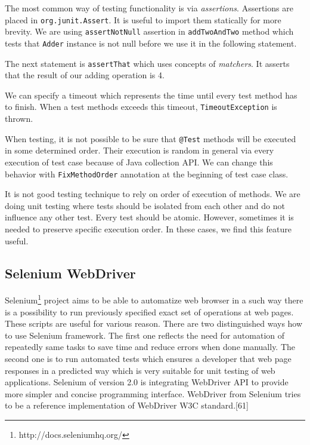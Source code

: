 \documentclass[12pt,final,oneside]{fithesis}
\begin{document}
The most common way of testing functionality is via \textit{assertions}. Assertions are placed in \texttt{org.junit.Assert}. It is useful to import them statically for more brevity. We are using \texttt{assertNotNull} assertion in \texttt{addTwoAndTwo} method which tests that \texttt{Adder} instance is not null before we use it in the following statement.

The next statement is \texttt{assertThat} which uses concepts of \textit{matchers}. It asserts that the result of our adding operation is 4.

We can specify a timeout which represents the time until every test method has to finish. When a test methods exceeds this timeout, \texttt{TimeoutException} is thrown.

When testing, it is not possible to be sure that \texttt{@Test} methods will be executed in some determined order. Their execution is random in general via every execution of test case because of Java collection API. We can change this behavior with \texttt{FixMethodOrder} annotation at the beginning of test case class.

It is not good testing technique to rely on order of execution of methods. We are doing unit testing where tests should be isolated from each other and do not influence any other test\cite{bib051}. Every test should be atomic. However, sometimes it is needed to preserve specific execution order. In these cases, we find this feature useful.

	\subsection{Selenium WebDriver}
	
Selenium\footnote{http://docs.seleniumhq.org/} project aims to be able to automatize web browser in a such way there is a possibility to run previously specified exact set of operations at web pages. These scripts are useful for various reason. There are two distinguished  ways how to use Selenium framework. The first one reflects the need for automation of repeatedly same tasks to save time and reduce errors when done manually. The second one is to run automated tests which ensures a developer that web page responses in a predicted way which is very suitable for unit testing of web applications. Selenium of version 2.0 is integrating WebDriver API to provide more simpler and concise programming interface. WebDriver from Selenium tries to be a reference implementation of WebDriver W3C standard.[61]
\end{document}
